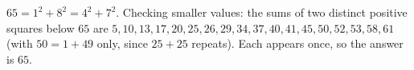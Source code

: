 $65=1^2+8^2=4^2+7^2$. Checking smaller values: the sums of two distinct positive squares below $65$ are $5,10,13,17,20,25,26,29,34,37,40,41,45,50,52,53,58,61$ (with $50=1+49$ only, since $25+25$ repeats). Each appears once, so the answer is $\boxed{65}$.
